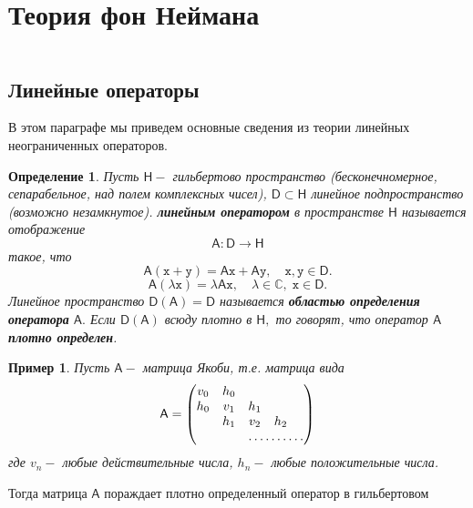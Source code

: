 \documentclass[12 pt, a4 paper]{article}
\theoremstyle{plain}   \newtheorem{Pro}{Задача}
\newtheorem{Def}{Определение}
\newtheorem{Exa}{Пример}
\begin{document}
\section{Теория фон Неймана}
$ \; $
\\
$ \; $
\\
\subsection{Линейные операторы}
$ \; $
\\
В этом параграфе мы приведем основные сведения из теории
линейных неограниченных операторов.
\begin{Def}
Пусть
$ \mathsf{H} - $
гильбертово пространство (бесконечномерное, сепарабельное,
над полем комплексных чисел),
$ \mathsf{D} \subset \mathsf{H} $
линейное подпространство (возможно незамкнутое).
{\bfseries линейным оператором}
в пространстве
$ \mathsf{H} $
называется отображение
$$
  \mathsf{A} : \mathsf{D} \longrightarrow \mathsf{H}
$$
такое, что
$$
  \mathsf{A}(\mathtt{x}+\mathtt{y})=
  \mathsf{A}\mathtt{x}+\mathsf{A}\mathtt{y},
  \quad \mathtt{x},\mathtt{y} \in \mathsf{D} .
$$
$$
  \mathsf{A}(\lambda \mathtt{x})=\lambda \mathsf{A}\mathtt{x},
  \quad \lambda \in \mathbb{C}, \; \mathtt{x} \in \mathsf{D}.
$$
Линейное пространство
$ \mathsf{D}(\mathsf{A})=\mathsf{D} $
называется
{\bfseries областью определения оператора}
$ \mathsf{A} . $
Если
$ \mathsf{D}(\mathsf{A}) $
всюду плотно в
$ \mathsf{H} , $
то говорят, что оператор
$ \mathsf{A} $
{\bfseries плотно определен}.
\end{Def}
\begin{Exa}
Пусть
$ \mathsf{A} - $
матрица Якоби, т.е. матрица вида
$$
  \mathsf{A}=
    \begin{pmatrix}
	  v_0 & h_0 & \; & \; & \; \\
	  h_0 & v_1 & h_1 & \; & \; \\
	  \; & h_1 & v_2 & h_2 & \; \\
	  \; & \; & \hdotsfor{3}
	\end{pmatrix}
$$
где
$ v_n - $
любые действительные числа,
$ h_n - $
любые положительные числа.
\end{Exa}
Тогда матрица
$ \mathsf{A} $
пораждает плотно определенный оператор в гильбертовом
\end{document}
